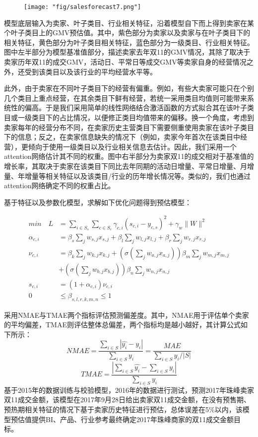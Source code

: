 \begin{figure}[!h]
	\centering
	\texttt{[image: "fig/salesforecast7.png"]}
	\caption{}
	\label{fig:sf7}
\end{figure}

模型底层输入为卖家、叶子类目、行业相关特征，沿着模型自下而上得到卖家在某个叶子类目上的GMV预估值。其中，紫色部分为卖家以及卖家与在叶子类目下的相关特征，黄色部分为叶子类目相关特征，蓝色部分为一级类目、行业相关特征。图中左半部分为模型基准值部分，描述卖家去年双11的GMV情况，其除了取决于卖家历年双11的成交GMV，活动日、平常日等成交GMV等卖家自身的经营情况之外，还受到该类目以及该行业的平均经营水平等。

此外，由于卖家在不同叶子类目下的经营有偏重。例如，有些大卖家可能只在个别几个类目上重点经营，在其余类目下鲜有经营，若统一采用类目均值则可能带来系统性的偏高。于是我们采用简单的线性网络结合激活函数的方式拟合其在该叶子类目或一级类目下的占比情况，以便修正类目均值带来的偏移。换一个角度，考虑到卖家每年的经营分布不同，在卖家历史主营类目下需要侧重使用卖家在该叶子类目下的信息；反之，在卖家信息缺失的情况下（例如，卖家今年首次在该类目中经营），更倾向于使用一级类目以及行业相关信息去估计。因此，我们采用一个attention网络估计其不同的权重。图中右半部分为卖家双11的成交相对于基准值的增长率，其取决于卖家在该类目下同比去年同期的活动日增量、平常日增量、月增量、年增量等相关特征以及该类目/行业的历年增长情况等。类似的，我们也通过attention网络确定不同的权重占比。

基于特征以及参数化模型，求解如下优化问题得到预估模型：

\begin{align}
min \quad L &= \sum_{i \in S_s}{\sum_{c \in S_c}\gamma_{c,i}(s_{c,i} - y_{c,s})^2 } + \gamma_w \lVert W \rVert^2 \\
\alpha_{c,i} &= \beta_s\sum_j{w_{s,j}x_{s,j}} + \beta_l\sum_j{w_{l,j}x_{l,j}} + \beta_r\sum_j{w_{r,j}x_{r,j}} \\
\nu_{c,i} &= \beta_k\sum_j{w_{k,j}x_{k,j}} + (\sigma(\sum_j{w_{a,j}x_{a,j}}))\beta_m\sum_j{w_{m,j}x_{m,j}} \\
&+ (\sigma(\sum_j{w_{b,j}x_{b,j}}))\beta_n\sum_j{w_{n,j}x_{n,j}} \\
s_{c,i} &= (1+\alpha_{c,i})\nu_{c,i} \\
0 &\le \beta_{s,l,r,k,m,n} \le 1
\end{align}

采用NMAE与TMAE两个指标评估预测偏差度。其中，NMAE用于评估单个卖家的平均偏差，TMAE则评估整体总偏差，两个指标均是越小越好，其计算公式如下所示：
$$NMAE=\frac{\sum_{i \in S}{|\hat{y_i} - y_i|}}{\sum_{i \in S}{y_i}}=\frac{MAE}{\sum_{i \in S}{y_i}/|S|}$$ $$TMAE=\frac{|\sum_{i \in S}{\hat{y_i} - \sum_{i \in S}{y_i}}|}{\sum_{i \in S}{y_i}}$$
基于2015年的数据训练与校验模型，2016年的数据进行测试，预测2017年珠峰卖家双11成交金额，该模型在2017年9月28日给出卖家双11成交金额，在没有预售期、预热期相关特征的情况下基于卖家历史特征进行预估，总体误差在5\%以内，该模型预估值提供BI、产品、行业参考最终确定2017年珠峰商家的双11成交金额目标。

